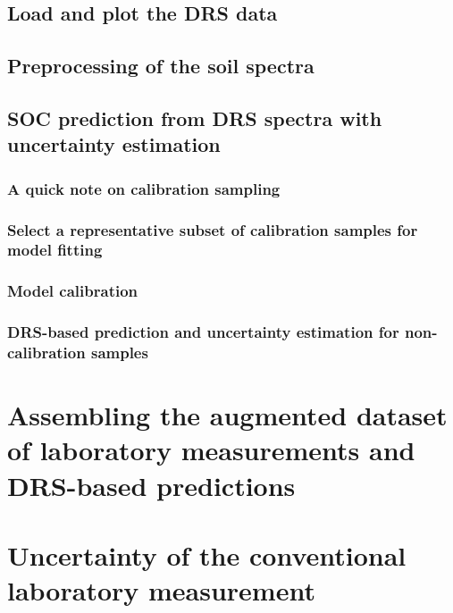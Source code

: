 \documentclass[
  10pt,
  b5paper,
  oneside]{book}
\begin{document}
\subsection{Load and plot the DRS data}\label{load-and-plot-the-drs-data}

\subsection{Preprocessing of the soil spectra}\label{preprocessing-of-the-soil-spectra}

\subsection{SOC prediction from DRS spectra with uncertainty estimation}\label{soc-prediction-from-drs-spectra-with-uncertainty-estimation}

\subsubsection{A quick note on calibration sampling}\label{a-quick-note-on-calibration-sampling}

\subsubsection{Select a representative subset of calibration samples for model fitting}\label{select-a-representative-subset-of-calibration-samples-for-model-fitting}

\subsubsection{Model calibration}\label{model-calibration}

\subsubsection{DRS-based prediction and uncertainty estimation for non-calibration samples}\label{drs-based-prediction-and-uncertainty-estimation-for-non-calibration-samples}

\section{Assembling the augmented dataset of laboratory measurements and DRS-based predictions}\label{assembling-the-augmented-dataset-of-laboratory-measurements-and-drs-based-predictions}

\section{Uncertainty of the conventional laboratory measurement}\label{uncertainty-of-the-conventional-laboratory-measurement}
\end{document}
